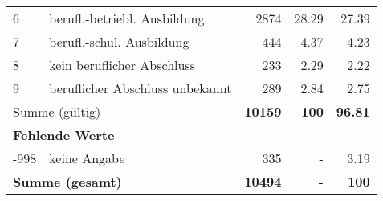 \begin{longtable}{lXrrr}
     6 &
     \multicolumn{1}{X}{ berufl.-betriebl. Ausbildung   } &


       \num{2874} &
       \num[round-mode=places,round-precision=2]{28.29} &
         \num[round-mode=places,round-precision=2]{27.39} \\

     7 &
     \multicolumn{1}{X}{ berufl.-schul. Ausbildung   } &


       \num{444} &
       \num[round-mode=places,round-precision=2]{4.37} &
         \num[round-mode=places,round-precision=2]{4.23} \\

     8 &
     \multicolumn{1}{X}{ kein beruflicher Abschluss   } &


       \num{233} &
       \num[round-mode=places,round-precision=2]{2.29} &
         \num[round-mode=places,round-precision=2]{2.22} \\

     9 &
     \multicolumn{1}{X}{ beruflicher Abschluss unbekannt   } &


       \num{289} &
       \num[round-mode=places,round-precision=2]{2.84} &
         \num[round-mode=places,round-precision=2]{2.75} \\
     \midrule
     \multicolumn{2}{l}{Summe (gültig)} &
       \textbf{\num{10159}} &
     \textbf{\num{100}} &
       \textbf{\num[round-mode=places,round-precision=2]{96.81}} \\
     \multicolumn{5}{l}{\textbf{Fehlende Werte}}\\
       -998 &
       keine Angabe &
         \num{335} &
        - &
         \num[round-mode=places,round-precision=2]{3.19} \\
     \midrule
     \multicolumn{2}{l}{\textbf{Summe (gesamt)}} &
          \textbf{\num{10494}} &
        \textbf{-} &
        \textbf{\num{100}} \\
     \bottomrule
     \end{longtable}
     

